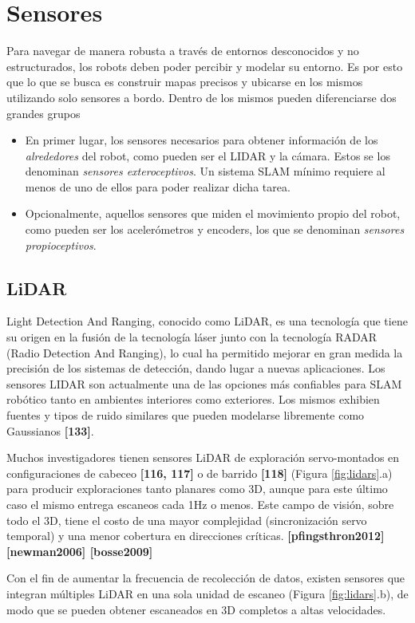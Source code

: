 \section{Sensores}
\label{sec:sensors}
Para navegar de manera robusta a través de entornos desconocidos y no estructurados, los robots deben poder percibir y modelar su entorno. Es por esto que lo que se busca es construir mapas precisos y ubicarse en los mismos utilizando solo sensores a bordo. Dentro de los mismos pueden diferenciarse dos grandes grupos
\begin{itemize}
    \item En primer lugar, los sensores necesarios para obtener información de los \textit{alrededores} del robot, como pueden ser el LIDAR y la cámara. Estos se los denominan \textit{sensores exteroceptivos}. Un sistema SLAM mínimo requiere al menos de uno de ellos para poder realizar dicha tarea.
    \item Opcionalmente, aquellos sensores que miden el movimiento propio del robot, como pueden ser los acelerómetros y encoders, los que se denominan \textit{sensores propioceptivos}.
\end{itemize}

\subsection{LiDAR}
Light Detection And Ranging, conocido como LiDAR, es una tecnología que tiene su origen en la fusión de la tecnología láser junto con la tecnología RADAR (Radio Detection And Ranging), lo cual ha permitido mejorar en gran medida la precisión de los sistemas de detección, dando lugar a nuevas aplicaciones. Los sensores LIDAR son actualmente una de las opciones más confiables para SLAM robótico tanto en ambientes interiores como exteriores. Los mismos exhibien fuentes y tipos de ruido similares que pueden modelarse libremente como Gaussianos \textbf{[133]}.

Muchos investigadores tienen sensores LiDAR de exploración servo-montados en configuraciones de cabeceo \textbf{[116, 117]} o de barrido \textbf{[118]} (Figura \ref{fig:lidars}.a) para producir exploraciones tanto planares como 3D, aunque para este último caso el mismo entrega escaneos cada 1Hz o menos. Este campo de visión, sobre todo el 3D, tiene el costo de una mayor complejidad (sincronización servo temporal) y una menor cobertura en direcciones críticas.
\textbf{[pfingsthron2012] [newman2006] [bosse2009]}

Con el fin de aumentar la frecuencia de recolección de datos, existen sensores que integran múltiples LiDAR en una sola unidad de escaneo (Figura \ref{fig:lidars}.b), de modo que se pueden obtener escaneados en 3D completos a altas velocidades.

